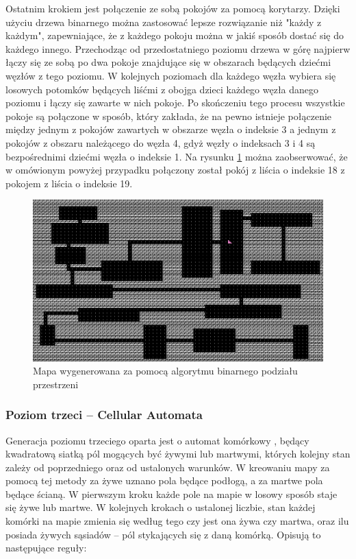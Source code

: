 \documentclass[12pt,twoside]{article}
\begin{document}
Ostatnim krokiem jest połączenie ze sobą pokojów za pomocą korytarzy. Dzięki użyciu drzewa binarnego można zastosować lepsze rozwiązanie niż "każdy z każdym", zapewniające, że z każdego pokoju można w jakiś sposób dostać się do każdego innego. Przechodząc od przedostatniego poziomu drzewa w górę najpierw łączy się ze sobą po dwa pokoje znajdujące się w obszarach będących dziećmi węzłów z tego poziomu. W kolejnych poziomach dla każdego węzła wybiera się losowych potomków będących liśćmi z obojga dzieci każdego węzła danego poziomu i łączy się zawarte w nich pokoje. Po skończeniu tego procesu wszystkie pokoje są połączone w sposób, który zakłada, że na pewno istnieje połączenie między jednym z pokojów zawartych w obszarze węzła o indeksie 3 a jednym z pokojów z obszaru należącego do węzła 4, gdyż węzły o indeksach 3 i 4 są bezpośrednimi dziećmi węzła o indeksie 1. Na rysunku \ref{generators:bsp_done} można zaobserwować, że w omówionym powyżej przypadku połączony został pokój z liścia o indeksie 18 z pokojem z liścia o indeksie 19.

\FloatBarrier
\begin{figure}[ht]
	\centering
	\includegraphics[width=14cm]{images/generators/bsp_done.png}
	\caption{Mapa wygenerowana za pomocą algorytmu binarnego podziału przestrzeni}
	\label{generators:bsp_done}
\end{figure}
\FloatBarrier


\subsubsection{Poziom trzeci -- Cellular Automata}
Generacja poziomu trzeciego oparta jest o automat komórkowy \cite{book_ca}, będący kwadratową siatką pól mogących być żywymi lub martwymi, których kolejny stan zależy od poprzedniego oraz od ustalonych warunków. W kreowaniu mapy za pomocą tej metody za żywe uznano pola będące podłogą, a za martwe pola będące ścianą. W pierwszym kroku każde pole na mapie w losowy sposób staje się żywe lub martwe. W kolejnych krokach o ustalonej liczbie, stan każdej komórki na mapie zmienia się według tego czy jest ona żywa czy martwa, oraz ilu posiada żywych sąsiadów -- pól stykających się z daną komórką. Opisują to następujące reguły:
\end{document}
